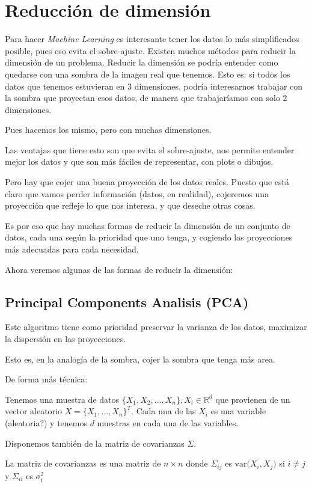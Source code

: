 \section{Reducción de dimensión}
Para hacer \textit{Machine Learning} es interesante tener los datos lo más simplificados posible, pues eso evita el sobre-ajuste. Existen muchos métodos para reducir la dimensión de un problema. Reducir la dimensión se podría entender como quedarse con una sombra de la imagen real que tenemos. Esto es: si todos los datos que tenemos estuvieran en 3 dimensiones, podría interesarnos trabajar con la sombra que proyectan esos datos, de manera que trabajaríamos con solo 2 dimensiones.

Pues hacemos los mismo, pero con muchas dimensiones.

Las ventajas que tiene esto son que evita el sobre-ajuste, nos permite entender mejor los datos y que son más fáciles de representar, con plots o dibujos.

Pero hay que cojer una buena proyección de los datos reales. Puesto que está claro que vamos perder información (datos, en realidad), cojeremos una proyección que refleje lo que nos interesa, y que deseche otras cosas.

Es por eso que hay muchas formas de reducir la dimensión de un conjunto de datos, cada una según la prioridad que uno tenga, y cogiendo las proyecciones más adecuadas para cada necesidad.

Ahora veremos algunas de las formas de reducir la dimensión:
\subsection{Principal Components Analisis (PCA)}
Este algoritmo tiene como prioridad preservar la varianza de los datos, maximizar la dispersión en las proyecciones.

Esto es, en la analogía de la sombra, cojer la sombra que tenga más area.

De forma más técnica:

Tenemos una muestra de datos $\{X_1,X_2,\dots, X_n\}, X_i \in \mathbb{R}^d$ que provienen de un vector aleatorio $X = \{X_1,\dots,X_n\}^T$. Cada una de las $X_i$ es una variable (aleatoria?) y tenemos $d$ muestras en cada una de las variables.

Disponemos también de la matriz de covarianzas $\Sigma$.

La matriz de covarianzas es una matriz de $n \times n$ donde $\Sigma_{ij}$ es $\text{var(}X_i,X_j\text{)}$ si $i \neq j$ y $\Sigma_{ii}$ es $\sigma_i^2$


